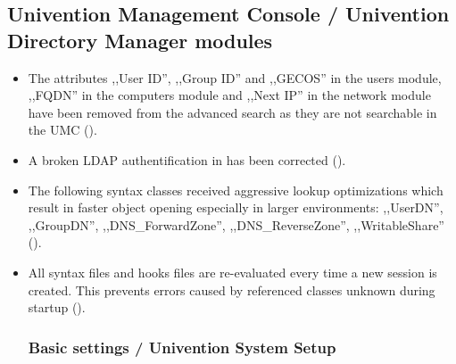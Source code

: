 \subsection{Univention Management Console / Univention Directory Manager modules}
\begin{itemize}
\item The attributes ,,User ID'', ,,Group ID'' and ,,GECOS'' in the users module, ,,FQDN'' in the computers
  module and ,,Next IP'' in the network module have been removed from the advanced search as they
  are not searchable in the UMC ().
\item A broken LDAP authentification in  has been corrected ().
\item The following syntax classes received aggressive lookup optimizations
  which result in faster object opening especially in larger environments:
  ,,UserDN'', ,,GroupDN'', ,,DNS\_ForwardZone'', ,,DNS\_ReverseZone'',
  ,,WritableShare'' ().
\item All syntax files and hooks files are re-evaluated every time a new
  session is created. This prevents errors caused by referenced classes unknown
  during  startup
  ().
\subsubsection{Basic settings / Univention System Setup}
\end{itemize}




